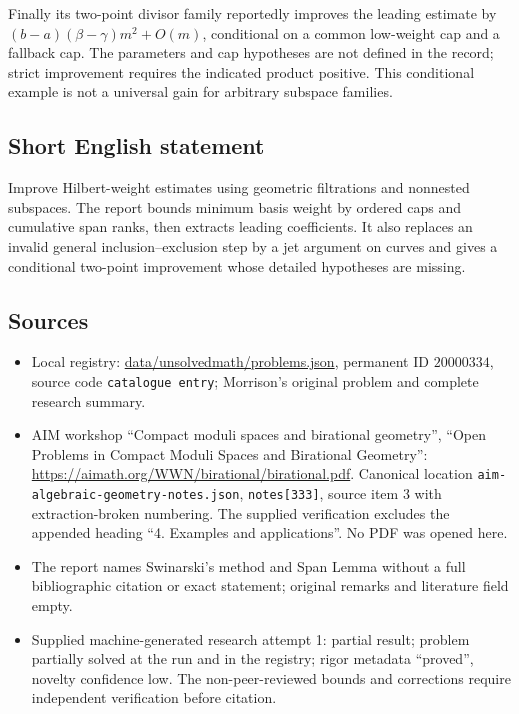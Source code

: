 \documentclass[11pt]{article}
\begin{document}
Finally its two-point divisor family reportedly improves the leading estimate by $(b-a)(\beta-\gamma)m^2+O(m)$, conditional on a common low-weight cap and a fallback cap. The parameters and cap hypotheses are not defined in the record; strict improvement requires the indicated product positive. This conditional example is not a universal gain for arbitrary subspace families.
\subsection{Short English statement}
Improve Hilbert-weight estimates using geometric filtrations and nonnested subspaces. The report bounds minimum basis weight by ordered caps and cumulative span ranks, then extracts leading coefficients. It also replaces an invalid general inclusion--exclusion step by a jet argument on curves and gives a conditional two-point improvement whose detailed hypotheses are missing.
\subsection{Sources}
\begin{itemize}
\item Local registry: \url{data/unsolvedmath/problems.json}, permanent ID $20000334$, source code \texttt{catalogue entry}; Morrison's original problem and complete research summary.
\item AIM workshop ``Compact moduli spaces and birational geometry'', ``Open Problems in Compact Moduli Spaces and Birational Geometry'': \url{https://aimath.org/WWN/birational/birational.pdf}. Canonical location \texttt{aim-algebraic-geometry-notes.json}, \texttt{notes[333]}, source item 3 with extraction-broken numbering. The supplied verification excludes the appended heading ``4. Examples and applications''. No PDF was opened here.
\item The report names Swinarski's method and Span Lemma without a full bibliographic citation or exact statement; original remarks and literature field empty.
\item Supplied machine-generated research attempt 1: partial result; problem partially solved at the run and in the registry; rigor metadata ``proved'', novelty confidence low. The non-peer-reviewed bounds and corrections require independent verification before citation.
\end{itemize}
\end{document}
